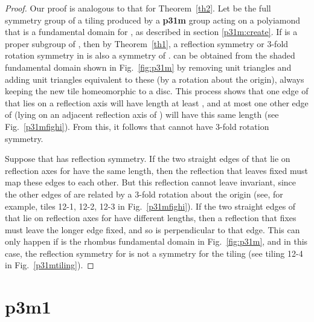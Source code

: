 \documentclass{ws-ijcga}
\begin{document}
\begin{proof}
Our proof is analogous to that for Theorem~\ref{th2}. 
Let  be the full symmetry group of a
tiling  produced by a {\bf p31m} group  acting on a polyiamond  that is a fundamental domain for , 
as described in section \ref{p31m:create}. 
If  is a proper subgroup of , then by Theorem~\ref{th1}, 
a reflection symmetry or 3-fold rotation symmetry in  is also a symmetry of . 
 can be obtained from the shaded fundamental domain shown in Fig.~\ref{fig:p31m} 
by removing unit triangles and adding unit triangles equivalent to these 
(by a  rotation about the origin), 
always keeping the new tile homeomorphic to a disc. 
This process shows that one edge of  that lies on a reflection axis will
have length at least , and at most one other edge of  (lying on an adjacent reflection axis of ) 
will have this same length (see Fig.~\ref{p31mfighi}). 
From this, it follows that  cannot have 3-fold rotation symmetry.

Suppose that  has reflection symmetry. 
If the two straight edges of  that lie on reflection
axes for  have the same length, then the reflection that leaves  fixed must map these edges to each other. 
But this reflection cannot leave  invariant, since the other edges of  are related by
a 3-fold rotation about the origin (see, for example, tiles 12-1, 12-2, 12-3 in Fig.~\ref{p31mfighi}). 
If the two straight edges of  that lie on reflection axes for  have different lengths, 
then a reflection that fixes  must leave the longer edge fixed, 
and so is perpendicular to that edge. 
This can only happen if  is the rhombus fundamental domain in Fig.~\ref{fig:p31m}, 
and in this case, the reflection symmetry for  is not a symmetry for the tiling  
(see tiling 12-4 in Fig.~\ref{p31mtiling}).
\end{proof}












\section{{\bf p3m1}}
\end{document}
